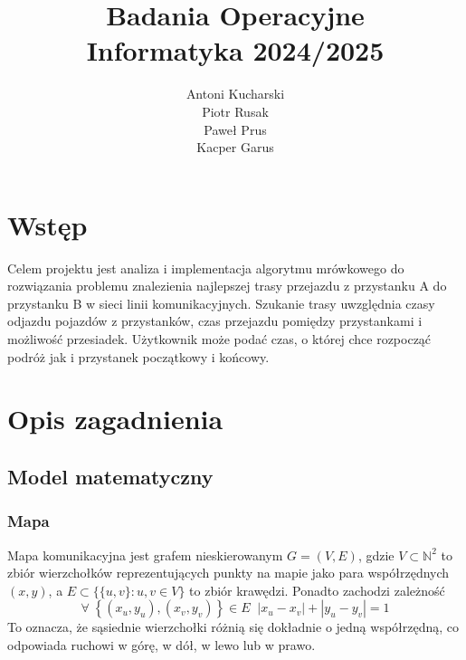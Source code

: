 \documentclass{article}
\begin{document}
\author{
    Antoni Kucharski \\
    Piotr Rusak \\
    Paweł Prus \\
    Kacper Garus
}
\title{
    \Huge \textbf{Badania Operacyjne} \\
    \textbf{Informatyka 2024/2025} \\
}

\begin{titlepage}
\maketitle    
\end{titlepage}

\tableofcontents
\newpage

\section{Wstęp}

Celem projektu jest analiza i implementacja algorytmu mrówkowego do rozwiązania problemu znalezienia najlepszej
trasy przejazdu z przystanku A do przystanku B w sieci linii komunikacyjnych. Szukanie trasy uwzględnia
czasy odjazdu pojazdów z przystanków, czas przejazdu pomiędzy przystankami i możliwość przesiadek.
Użytkownik może podać czas, o której chce rozpocząć podróż jak i przystanek początkowy i końcowy.

\section{Opis zagadnienia}

\subsection{Model matematyczny}
\subsubsection{Mapa}
Mapa komunikacyjna jest grafem nieskierowanym \(G = (V, E)\), gdzie \(V\subset{\mathbb{N}}^2\) to zbiór wierzchołków
reprezentujących punkty na mapie jako para współrzędnych \((x, y)\), a \(E \subset \{\{u, v\} : u, v\in V\}\) to zbiór krawędzi. Ponadto
zachodzi zależność
\[\forall\;\left\{(x_u, y_u), (x_v, y_v)\right\} \in E\;\; |x_u - x_v| + |y_u - y_v| = 1\]
To oznacza, że sąsiednie wierzchołki różnią się dokładnie o jedną współrzędną, co odpowiada ruchowi w górę, w dół, w lewo lub w prawo.
\end{document}
